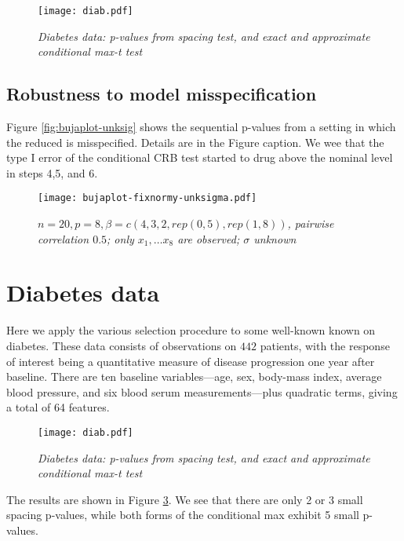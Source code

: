 \documentclass{article}
\begin{document}
{{\begin{figure}[hbtp]
\centering
\texttt{[image: diab.pdf]}  
\caption{\em Diabetes data: p-values from spacing test, and exact and approximate conditional max-t test}
\label{fig:diab}
\end{figure}

\subsection{Robustness to model misspecification}
Figure \ref{fig:bujaplot-unksig} shows the sequential p-values from a setting in which the reduced is misspecified.
Details are in the Figure caption.  We wee that the type I error of the conditional CRB test  started to drug above the nominal level in steps 
4,5, and 6.
\begin{figure}[hbtp]
\centering
\texttt{[image: bujaplot-fixnormy-unksigma.pdf]}  
\caption{\em $n=20, p=8, \beta=c(4,3,2,rep(0,5),rep(1,8))$, pairwise correlation $0.5$; only $x_1, \ldots x_8$ are
observed; $\sigma$ unknown}
\label{fig:bujaplot-unknsig}
\end{figure}

\section{Diabetes data}
Here we apply the various selection procedure to some well-known known on diabetes.
These data consists of  observations on $442$ patients, with the response of interest being a quantitative measure of disease progression one year after baseline.
There are ten baseline variables---age, sex, body-mass index, average blood pressure,
and six blood serum measurements---plus quadratic terms, giving a total of 64 features.
\begin{figure}[hbtp]
\centering
\texttt{[image: diab.pdf]}  
\caption{\em Diabetes data: p-values from spacing test, and exact and approximate conditional max-t test}
\label{fig:diab}
\end{figure}
The results are shown in Figure \ref{fig:diab}. We see that there are only 2 or 3 small spacing p-values, while both forms of the conditional max exhibit 5 small p-values.



}}
\end{document}
